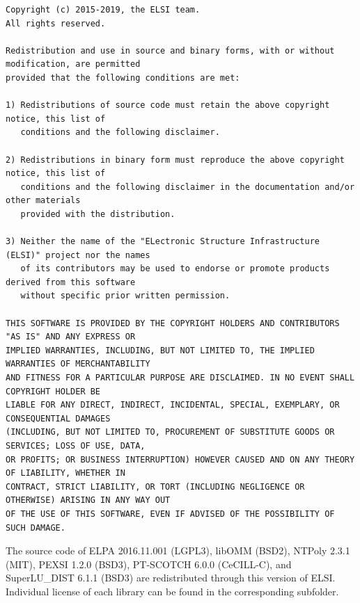 \documentclass{report}
\begin{document}
\begin{tcolorbox}
\begin{Verbatim}
Copyright (c) 2015-2019, the ELSI team.
All rights reserved.

Redistribution and use in source and binary forms, with or without modification, are permitted
provided that the following conditions are met:

1) Redistributions of source code must retain the above copyright notice, this list of
   conditions and the following disclaimer.

2) Redistributions in binary form must reproduce the above copyright notice, this list of
   conditions and the following disclaimer in the documentation and/or other materials
   provided with the distribution.

3) Neither the name of the "ELectronic Structure Infrastructure (ELSI)" project nor the names
   of its contributors may be used to endorse or promote products derived from this software
   without specific prior written permission.

THIS SOFTWARE IS PROVIDED BY THE COPYRIGHT HOLDERS AND CONTRIBUTORS "AS IS" AND ANY EXPRESS OR
IMPLIED WARRANTIES, INCLUDING, BUT NOT LIMITED TO, THE IMPLIED WARRANTIES OF MERCHANTABILITY
AND FITNESS FOR A PARTICULAR PURPOSE ARE DISCLAIMED. IN NO EVENT SHALL COPYRIGHT HOLDER BE
LIABLE FOR ANY DIRECT, INDIRECT, INCIDENTAL, SPECIAL, EXEMPLARY, OR CONSEQUENTIAL DAMAGES
(INCLUDING, BUT NOT LIMITED TO, PROCUREMENT OF SUBSTITUTE GOODS OR SERVICES; LOSS OF USE, DATA,
OR PROFITS; OR BUSINESS INTERRUPTION) HOWEVER CAUSED AND ON ANY THEORY OF LIABILITY, WHETHER IN
CONTRACT, STRICT LIABILITY, OR TORT (INCLUDING NEGLIGENCE OR OTHERWISE) ARISING IN ANY WAY OUT
OF THE USE OF THIS SOFTWARE, EVEN IF ADVISED OF THE POSSIBILITY OF SUCH DAMAGE.
\end{Verbatim}
\end{tcolorbox}

The source code of ELPA 2016.11.001 (LGPL3), libOMM (BSD2), NTPoly 2.3.1 (MIT), PEXSI 1.2.0 (BSD3), PT-SCOTCH 6.0.0 (CeCILL-C), and SuperLU\_DIST 6.1.1 (BSD3) are redistributed through this version of ELSI. Individual license of each library can be found in the corresponding subfolder.
\end{document}
